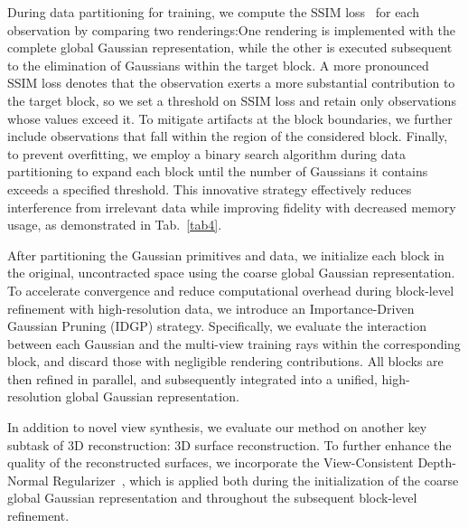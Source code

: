 During data partitioning for training, we compute the SSIM loss~\cite{mss} for each observation by comparing two renderings:One rendering is implemented with the complete global Gaussian representation, while the other is executed subsequent to the elimination of Gaussians within the target block. A more pronounced SSIM loss denotes that the observation exerts a more substantial contribution to the target block, so we set a threshold on SSIM loss and retain only observations whose values exceed it.
To mitigate artifacts at the block boundaries, we further include observations that fall within the region of the considered block.
Finally, to prevent overfitting, we employ a binary search algorithm during data partitioning to expand each block until the number of Gaussians it contains exceeds a specified threshold.
This innovative strategy effectively reduces interference from irrelevant data while improving fidelity with decreased memory usage, as demonstrated in Tab.~\ref{tab4}.

After partitioning the Gaussian primitives and data, we initialize each block in the original, uncontracted space using the coarse global Gaussian representation. To accelerate convergence and reduce computational overhead during block-level refinement with high-resolution data, we introduce an Importance-Driven Gaussian Pruning (IDGP) strategy. {Specifically, we evaluate the interaction between each Gaussian and the multi-view training rays within the corresponding block, and discard those with negligible rendering contributions. All blocks are then refined in parallel, and subsequently integrated into a unified, high-resolution global Gaussian representation.}
%

In addition to novel view synthesis, we evaluate our method on another key subtask of 3D reconstruction: 3D surface reconstruction. To further enhance the quality of the reconstructed surfaces, we incorporate the View-Consistent Depth-Normal Regularizer~\cite{vcR}, which is applied both during the initialization of the coarse global Gaussian representation and throughout the subsequent block-level refinement.
%
%

